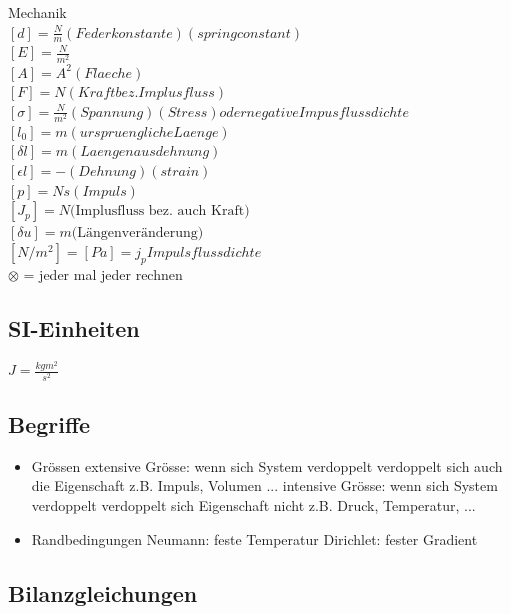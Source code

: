 \documentclass[a4paper]{scrartcl}
\begin{document}
Mechanik\\
$ [d]=\frac{N}{m} (Federkonstante)(spring constant)$\\
$ [E]=\frac{N}{m^2} $\\
$ [A]=A^2 (Flaeche)$\\
$ [F]=N (Kraft bez. Implusfluss)$\\
$ [\sigma]=\frac{N}{m^2} (Spannung)(Stress)oder negative Impusflussdichte$\\
$ [l_0]=m (urspruengliche Laenge)$\\
$ [\delta l]=m (Laengenausdehnung)$\\
$ [\epsilon l]=- (Dehnung)(strain)$\\
$ [p]=Ns (Impuls)$\\
$ [J_p]  = N \text{(Implusfluss bez. auch Kraft)} $\\
$ [\delta u] = m \text{(Längenveränderung)}$\\
$ [N/m^2] = [Pa] = j_p Impulsflussdichte$\\



$ \otimes $ = jeder mal jeder rechnen




\subsection{SI-Einheiten}
$ J = \frac{kg m^2}{s^2} $\\

\subsection{Begriffe}
\begin{itemize}
\item Grössen
\subitem extensive Grösse: wenn sich System verdoppelt verdoppelt sich auch die Eigenschaft z.B. Impuls, Volumen ...
\subitem intensive Grösse: wenn sich System verdoppelt verdoppelt sich Eigenschaft nicht z.B. Druck, Temperatur, ...
\item Randbedingungen
\subitem Neumann: feste Temperatur
\subitem Dirichlet: fester Gradient
\end{itemize}


\subsection{Bilanzgleichungen}
\end{document}
